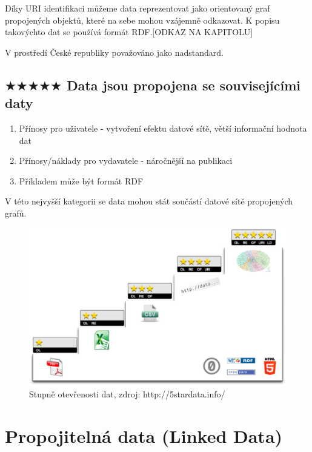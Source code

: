 Díky URI identifikaci můžeme data reprezentovat jako orientovaný graf propojených objektů, které na sebe mohou vzájemně odkazovat. K popisu takovýchto dat se používá formát RDF.[ODKAZ NA KAPITOLU]  

V prostředí České republiky považováno jako nadstandard.

\subsection*{$\bigstar\bigstar\bigstar\bigstar\bigstar$ Data jsou propojena se souvisejícími daty}

\medskip

\begin{enumerate}
\item Přínosy pro uživatele - vytvoření efektu datové sítě, větší informační hodnota dat    
\item Přínosy/náklady pro vydavatele - náročnější na publikaci
\item Příkladem může být formát RDF
\end{enumerate}

V této nejvyšší kategorii se data mohou stát součástí datové sítě propojených grafů.

\begin{figure}[h]
\centerline{\includegraphics[width=\textwidth]{img/5star_steps.eps}}
\caption{Stupně otevřenosti dat, zdroj: http://5stardata.info/}
\label{obr:5star_steps}
\end{figure}

\newpage

\section{Propojitelná data (Linked Data)}

